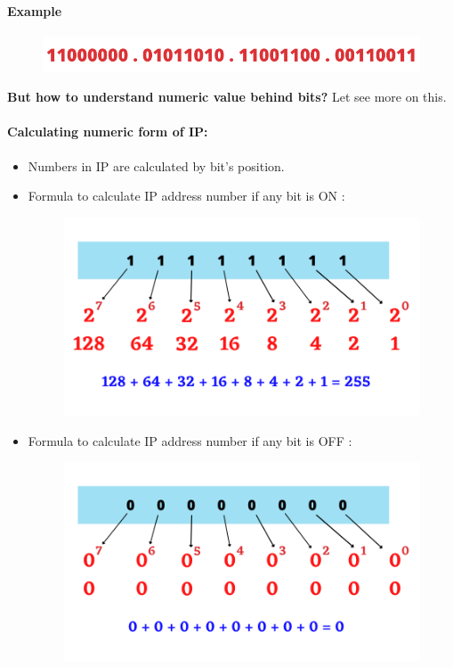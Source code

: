 \begin{flushleft}
\paragraph{Example}
\begin{figure}[h!]
	\centering
	\includegraphics[scale=0.6]{content/chapter14/images/ip2.png}
\end{figure}
\textbf{But how to understand numeric value behind bits?} Let see more on this.

\newpage

\paragraph{Calculating numeric form of IP:}
\begin{itemize}
	\item Numbers in IP are calculated by bit's position.
	\item Formula to calculate IP address number if any bit is \color{blue} ON \color{black}:
	\begin{figure}[h!]
		\centering
		\includegraphics[scale=0.6]{content/chapter14/images/ip3.png}
	\end{figure}
	\item Formula to calculate IP address number if any bit is \color{red} OFF \color{black}:
	\begin{figure}[h!]
		\centering
		\includegraphics[scale=0.6]{content/chapter14/images/ip4.png}
	\end{figure}
\end{itemize}
\newpage

\end{flushleft}
